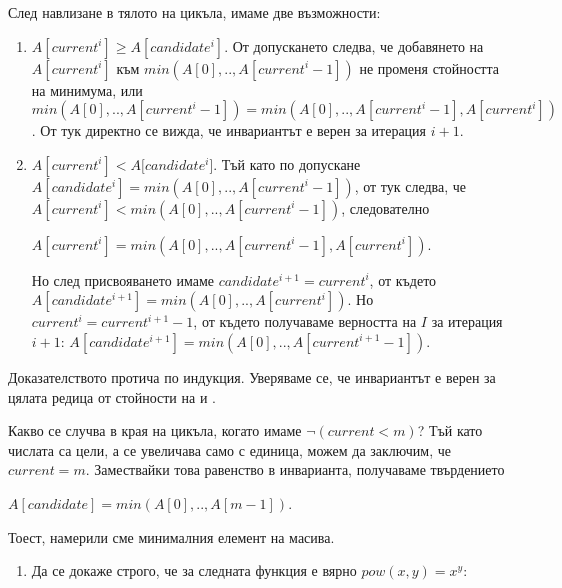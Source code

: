 {\begin{mdframed}[hidealllines=true,backgroundcolor=gray!20]
След навлизане в тялото на цикъла, имаме две възможности:
\begin{enumerate}[label=\arabic*)]
  \item $A[current^i]\geq A[candidate^i]$. От допускането следва, че добавянето на $A[current^i]$ към $min(A[0],..,A[current^i-1])$ не променя стойността на минимума, или $min(A[0],..,A[current^i-1])=min(A[0],..,A[current^i-1],A[current^i])$. От тук директно се вижда, че инвариантът е верен за итерация $i+1$.
  \item $A[current^i] < A[candidate^i$]. Тъй като по допускане $A[candidate^i] = min(A[0], .., A[current^i-1])$, от тук следва, че $A[current^i] < min(A[0], .., A[current^i-1])$, следователно

   $A[current^i] = min(A[0], .., A[current^i-1], A[current^i])$.

   Но след присвояването имаме $candidate^{i+1} = current^i$, от където $A[candidate^{i+1}] = min(A[0],..,A[current^i])$. Но $current^i = current^{i+1}-1$, от където получаваме верността на $I$ за итерация $i+1$: $A[candidate^{i+1}] = min(A[0], .., A[current^{i+1}-1])$.

\end{enumerate}
  Доказателството протича по индукция. Уверяваме се, че инвариантът е верен за цялата редица от стойности на  и .

  Какво се случва в края на цикъла, когато имаме $\neg(current<m)$? Тъй като числата са цели, а  се увеличава само с единица, можем да заключим, че $current=m$. Замествайки това равенство в инварианта, получаваме твърдението

  $A[candidate] = min(A[0], .., A[m-1])$.

  Тоест, намерили сме минималния елемент на масива.
\end{mdframed}

\begin{enumerate}[resume]
  \item Да се докаже строго, че за следната функция е вярно $pow(x,y)=x^y$:
  \begin{enumerate}[label=\alph*)]%


\end{enumerate}
\end{enumerate}}
